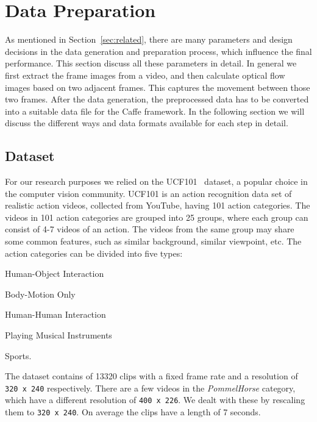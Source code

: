 \section{Data Preparation}
\label{sec:data}

As mentioned in Section~\ref{sec:related}, there are many parameters and design decisions in the data generation and preparation process, which influence the final performance.
This section discuss all these parameters in detail.
In general we first extract the frame images from a video, and then calculate optical flow images based on two adjacent frames.
This captures the movement between those two frames.
After the data generation, the preprocessed data has to be converted into a suitable data file for the Caffe framework.
In the following section we will discuss the different ways and data formats available for each step in detail.


\subsection{Dataset}
For our research purposes we relied on the UCF101~\cite{soomro2012ucf101} dataset, a popular choice in the computer vision community.
UCF101 is an action recognition data set of realistic action videos, collected from YouTube, having 101 action categories.
The videos in 101 action categories are grouped into 25 groups, where each group can consist of 4-7 videos of an action.
The videos from the same group may share some common features, such as similar background, similar viewpoint, etc.
The action categories can be divided into five types:
\begin{enumerate*}
	\item Human-Object Interaction
	\item Body-Motion Only
	\item Human-Human Interaction
	\item Playing Musical Instruments
	\item Sports.
\end{enumerate*}
The dataset contains of 13320 clips with a fixed frame rate and a resolution of \texttt{320 x 240} respectively.
There are a few videos in the \emph{PommelHorse} category, which have a different resolution of \texttt{400 x 226}.
We dealt with these by rescaling them to \texttt{320 x 240}.
On average the clips have a length of 7 seconds.

